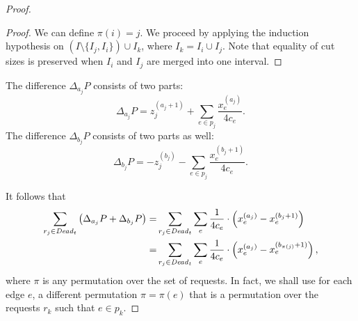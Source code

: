 \documentclass[11pt]{article}
\newenvironment{proof sketch}[1]{\noindent {\emph{Proof sketch of #1:}}}{\hfill \qed}
\newcommand{\PRaj}{\Delta_{a_j} P}
\newcommand{\PRbj}{\Delta_{b_j} P}
\newcommand{\PRx}[1]{\Delta_{#1} P}
\newcommand{\dead}{\text{\textit{Dead}}}
\begin{document}
\begin{proof}
\begin{proof}
We can define $\pi(i)=j$. We proceed by applying the induction
hypothesis on $\left(I \setminus \{I_j,I_i\}\right)\cup I_{k}$, where
$I_{k} = I_{i}\cup I_{j}$. Note that equality of cut sizes is preserved when $I_i$ and $I_j$ are merged into one interval.
\end{proof}

\begin{comment}
  \begin{figure}[H]
    \begin{center}
      \texttt{[image: intervals.eps]}
    \end{center}
    \caption{There are $6$ intervals. Note that all the intervals do
      not share endpoints. The numbers on top of each interval are
      $\ell(\alpha_j)$ and $\ell(\beta_j)$, e.g., in the top interval the left
      endpoint is labeled by $\ell(\alpha_j) = 1$ and the right endpoint is
      labeled by $\ell(\beta_j)=4$. The induction step in the proof of
      Proposition~\ref{prop:mapping} has two main cases, both of which
      are depicted as dashed frames.  Note that the induction step
      implies that the removal of the bottom right interval does not
      affect the labeling of the other intervals. Moreover, it also
      implies, that the replacing the two middle intervals (in the
      dashed frame) with their union does not affect the labeling of
      the other intervals - this property is used to construct the
      function $\pi$.}
    \label{fig:intervals}
  \end{figure}
\end{comment}


The difference $\PRx{a_j}$ consists of two parts:
\[
\PRx{a_j} = z_j^{(a_j+1)} +\sum_{e\in p_j} \frac{x_e^{(a_j)}}{4c_e}.
\]
The difference $\PRx{b_j}$ consists of two parts as well:
\[
\PRx{b_j} = -z_j^{(b_j)} -\sum_{e\in p_j} \frac{x_e^{(b_j+1)}}{4c_e}.
\]

It follows that
\begin{align*}
       \sum_{r_j \in \dead_t}\left(\PRaj +\PRbj \right) =&\sum_{r_j \in \dead_t} \sum_e \frac{1}{4c_e}\cdot \left(x_e^{(a_j)} - x_e^{(b_j+1)}\right)\\
=&
\sum_{r_j \in \dead_t} \sum_e \frac{1}{4c_e}\cdot \left(x_e^{(a_j)} - x_e^{(b_{\pi(j)}+1)}\right),\\
\end{align*}
where $\pi$ is any permutation over the set of requests.  In fact, we
shall use for each edge $e$, a different permutation $\pi=\pi(e)$ that
is a permutation over the requests $r_k$ such that $e\in p_k$.


\end{proof}
\end{document}
